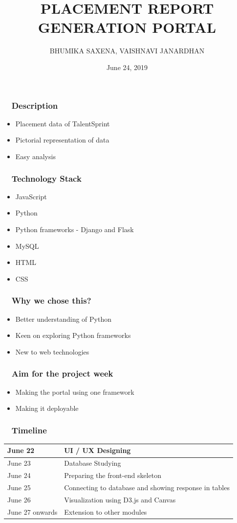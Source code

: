 \documentclass{beamer}
\title[Placement Report Generation Portal]{PLACEMENT REPORT GENERATION PORTAL } %
\author[Bhumika, Vaishnavi]{BHUMIKA SAXENA, VAISHNAVI JANARDHAN} %
{
\medskip
}
\date{June 24, 2019} %
\begin{document}
\begin{frame}
\titlepage %
\end{frame}

\begin{frame}
\frametitle{~ Description}
\begin {itemize}
\item{Placement data of TalentSprint}
\bigskip
\bigskip
\item{Pictorial representation of data}
\bigskip
\bigskip
\item{Easy analysis}
\end{itemize}
\end{frame}

\begin{frame}
\frametitle{ ~ Technology Stack} 
\begin{itemize}
\item{JavaScript}
\item{Python} 
\item{Python frameworks - Django and Flask}
\item{MySQL}
\item{HTML} 
\item{CSS}
\end{itemize}
\end{frame}

\begin{frame}
\frametitle{ ~ Why we chose this?} 
\begin{itemize}
\item{Better understanding of Python}
\item{Keen on exploring Python frameworks}
\item{New to web technologies} 
\end{itemize}
\end{frame}

\begin{frame}
\frametitle{ ~ Aim for the project week} 
\begin{itemize}
\item{Making the portal using one framework}
\item{Making it deployable}
\end{itemize}
\end{frame}

\begin{frame}
\frametitle{~ Timeline}
\begin{tabular}{|l|l|}
     \hline
     June 22 & UI / UX Designing\\
     \hline
     June 23 & Database Studying\\
     \hline
     June 24 & Preparing the front-end skeleton\\
     \hline
     June 25 & Connecting to database and showing response in tables\\
     \hline
     June 26 & Visualization using D3.js and Canvas\\
     \hline
     June 27 onwards & Extension to other modules\\
     \hline
     
\end{tabular}
    
\end{frame}
\end{document}
